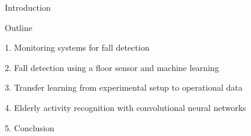 \begin{frame}{Introduction}
\begin{minipage}[t]{0.47\linewidth}
\end{minipage}
\end{frame}

\endgroup

\begingroup
{}
\setcounter{tocdepth}{1}
\begin{frame}[noframenumbering]{Outline}
    \centering
    \Large
    \renewcommand{\ratio}{0.5}
    \vspace{\ratio cm}
    
    \textcolor{myblue}{1. Monitoring systems for fall detection}
    
    \vspace{\ratio cm}
            
     \textcolor{myblue}{       2. Fall detection using a floor sensor and machine learning}
            
    \vspace{\ratio cm}
    
     \textcolor{myblue}{      3. Transfer learning from experimental setup to operational data}
     
    \vspace{\ratio cm}
            
     \textcolor{myblue}{       4. Elderly activity recognition with convolutional neural networks}
     
    \vspace{\ratio cm}
    
     \textcolor{myblue}{       5. Conclusion}
\end{frame}
\endgroup

